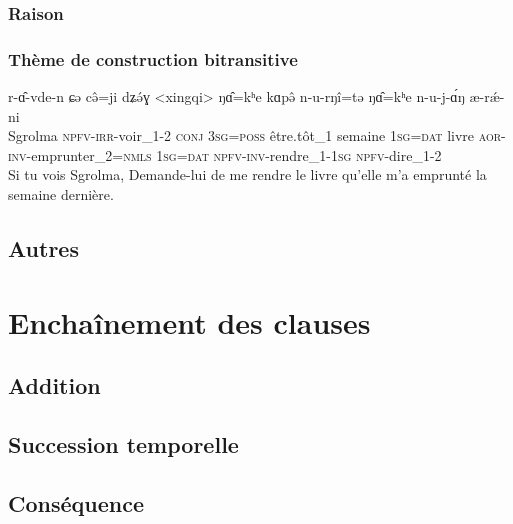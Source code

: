 \documentclass[11pt, a4paper]{book}              %
\newcommand{\ipa}[1]{{\phon \mbox{#1}}} %
\begin{document}
\subsection{Raison}

\subsection{Thème de construction bitransitive}


\begin{exe}
\ex \begin{xlist}

\ex 
\gll \ipa{dʐomɑ́} \ipa{r-ɑ̂-vde-n} \ipa{ɕə} \ipa{cə̂=ji} \ipa{dʑə́ɣ} \ipa{<xingqi>} \ipa{ŋɑ̂=kʰe} \ipa{kɑpə̂} \ipa{n-u-rŋî=tə} \ipa{ŋɑ̂=kʰe} \ipa{n-u-j-ɑ́ŋ} \ipa{æ-rǽ-ni}  \\
Sgrolma \textsc{npfv-irr-}voir_1-\textsc{2} \textsc{conj} \textsc{3sg=poss} être.tôt_1 semaine \textsc{1sg=dat} livre \textsc{aor-inv-}emprunter_2=\textsc{nmls} \textsc{1sg=dat} \textsc{npfv-inv-}rendre_1-\textsc{1sg} \textsc{npfv-}dire_1-2\\
Si tu vois Sgrolma, Demande-lui de me rendre le livre qu'elle m'a emprunté la semaine dernière.\\


\end{xlist}
\end{exe}



\section{Autres}

\chapter{Enchaînement des clauses}

\section{Addition}

\section{Succession temporelle}

\section{Conséquence}
\end{document}

